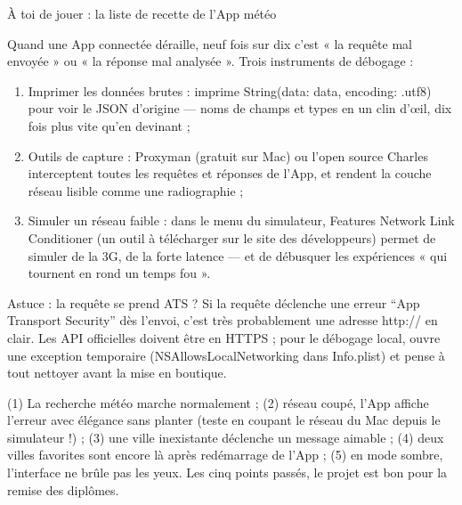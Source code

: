 \begin{tcbpractice}{À toi de jouer : la liste de recette de l'App météo}

Quand une App connectée déraille, neuf fois sur dix c'est « la requête mal envoyée » ou « la réponse mal analysée ». Trois instruments de débogage :

\begin{enumerate}
  \item Imprimer les données brutes : imprime String(data: data, encoding: .utf8) pour voir le JSON d'origine — noms de champs et types en un clin d'œil, dix fois plus vite qu'en devinant ;
  \item Outils de capture : Proxyman (gratuit sur Mac) ou l'open source Charles interceptent toutes les requêtes et réponses de l'App, et rendent la couche réseau lisible comme une radiographie ;
  \item Simuler un réseau faible : dans le menu du simulateur, Features Network Link Conditioner (un outil à télécharger sur le site des développeurs) permet de simuler de la 3G, de la forte latence — et de débusquer les expériences « qui tournent en rond un temps fou ».
\end{enumerate}

\begin{tcbinfo}{Astuce : la requête se prend ATS ?}
Si la requête déclenche une erreur “App Transport Security” dès l'envoi, c'est très probablement une adresse http:// en clair. Les API officielles doivent être en HTTPS ; pour le débogage local, ouvre une exception temporaire (NSAllowsLocalNetworking dans Info.plist) et pense à tout nettoyer avant la mise en boutique.

\end{tcbinfo}

(1) La recherche météo marche normalement ; (2) réseau coupé, l'App affiche l'erreur avec élégance sans planter (teste en coupant le réseau du Mac depuis le simulateur !) ; (3) une ville inexistante déclenche un message aimable ; (4) deux villes favorites sont encore là après redémarrage de l'App ; (5) en mode sombre, l'interface ne brûle pas les yeux. Les cinq points passés, le projet est bon pour la remise des diplômes.

\end{tcbpractice}

